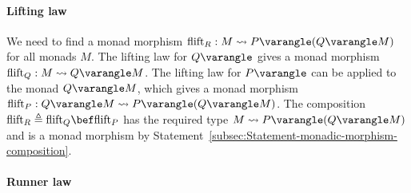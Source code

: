 \paragraph{Lifting law}

We need to find a monad morphism $\text{flift}_{R}:M\leadsto P\varangle(Q\varangle M)$
for all monads $M$. The lifting law for $Q\varangle$ gives a monad
morphism $\text{flift}_{Q}:M\leadsto Q\varangle M$. The lifting law
for $P\varangle$ can be applied to the monad $Q\varangle M$, which
gives a monad morphism $\text{flift}_{P}:Q\varangle M\leadsto P\varangle(Q\varangle M)$.
The composition $\text{flift}_{R}\triangleq\text{flift}_{Q}\bef\text{flift}_{P}$
has the required type $M\leadsto P\varangle(Q\varangle M)$ and is
a monad morphism by Statement~\ref{subsec:Statement-monadic-morphism-composition}.

\paragraph{Runner law}

